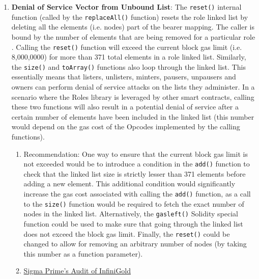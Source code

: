 \begin{enumerate}
\item\textbf{Denial of Service Vector from Unbound List}: The \verb|reset()| internal function (called by the \verb|replaceAll()| function) resets the role linked list by deleting all the elements (i.e. nodes) part of the bearer mapping. The caller is bound by the number of elements that are being removed for a particular role . Calling the \verb|reset()| function will exceed the current block gas limit (i.e. 8,000,0000) for more than 371 total elements in a role linked list. Similarly, the \verb|size()| and \verb|toArray()| functions also loop through the linked list. This essentially means that listers, unlisters, minters, pausers, unpausers and owners can perform denial of service attacks on the lists they administer. In a scenario where the Roles library is leveraged by other smart contracts, calling these two functions will also result in a potential denial of service after a certain number of elements have been included in the linked list (this number would depend on the gas cost of the Opcodes implemented by the calling functions).
	\begin{enumerate}
	\item Recommendation: One way to ensure that the current block gas limit is not exceeded would be to introduce a condition in the \verb|add()| function to check that the linked list size is strictly lesser than 371 elements before adding a new element. This additional condition would significantly increase the gas cost associated with calling the \verb|add()| function, as a call to the \verb|size()| function would be required to fetch the exact number of nodes in the linked list. Alternatively, the \verb|gasleft()| Solidity special function could be used to make sure that going through the linked list does not exceed the block gas limit. Finally, the \verb|reset()| could be changed to allow for removing an arbitrary number of nodes (by taking this number as a function parameter).
	\item\href{https://github.com/sigp/public-audits/raw/master/infinigold/review.pdf}{Sigma Prime's Audit of InfiniGold}
	\end{enumerate}


\end{enumerate}
